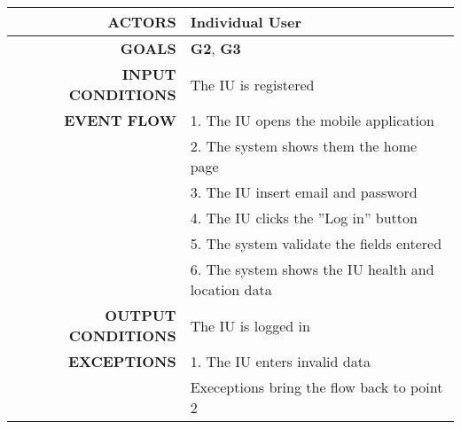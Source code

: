 \begin{table}[h!]
\begin{tabular}{|r|p{3in}|}
\hline
\textbf{ACTORS} & Individual User\\
\hline
\textbf{GOALS} &	\textbf{G2}, \textbf{G3}\\
\hline
\textbf{INPUT CONDITIONS} & The IU is registered \\
\hline
\textbf{EVENT FLOW} 
&1. The IU opens the mobile application\\
&2. The system shows them the home page\\
&3. The IU insert email and password\\
&4. The IU clicks the ''Log in'' button\\
&5. The system validate the fields entered\\
&6. The system shows the IU health and location data \\
\hline
\textbf{OUTPUT CONDITIONS} & The IU is logged in \\
\hline
\textbf{EXCEPTIONS} 
&1. The IU enters invalid data  \\
&Execeptions bring the flow back to point 2 \\
\hline
\end{tabular}
\end{table}